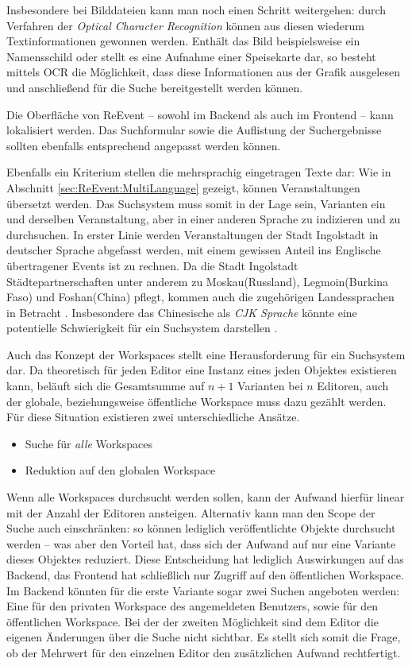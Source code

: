 Insbesondere bei Bilddateien kann man noch einen Schritt weitergehen: durch Verfahren der \emph{Optical Character Recognition} können aus diesen wiederum Textinformationen gewonnen werden. Enthält das Bild beispielsweise ein Namensschild oder stellt es eine Aufnahme einer Speisekarte dar, so besteht mittels OCR die Möglichkeit, dass diese Informationen aus der Grafik ausgelesen und anschließend für die Suche bereitgestellt werden können.

Die Oberfläche von ReEvent -- sowohl im Backend als auch im Frontend -- kann lokalisiert werden. Das Suchformular sowie die Auflistung der Suchergebnisse sollten ebenfalls entsprechend angepasst werden können.

Ebenfalls ein Kriterium stellen die mehrsprachig eingetragen Texte dar: Wie in Abschnitt \ref{sec:ReEvent:MultiLanguage} gezeigt, können Veranstaltungen übersetzt werden. Das Suchsystem muss somit in der Lage sein, Varianten ein und derselben Veranstaltung, aber in einer anderen Sprache zu indizieren und zu durchsuchen. In erster Linie werden Veranstaltungen der Stadt Ingolstadt in deutscher Sprache abgefasst werden, mit einem gewissen Anteil ins Englische übertragener Events ist zu rechnen. Da die Stadt Ingolstadt Städtepartnerschaften unter anderem zu Moskau(Russland), Legmoin(Burkina Faso) und Foshan(China) pflegt, kommen auch die zugehörigen Landessprachen in Betracht \cite{StadtIngolstadt.2014}. Insbesondere das Chinesische als \emph{CJK Sprache} könnte eine potentielle Schwierigkeit für ein Suchsystem darstellen \cite[S. 95f]{Buttcher.2010}.

Auch das Konzept der Workspaces stellt eine Herausforderung für ein Suchsystem dar. Da theoretisch für jeden Editor eine Instanz eines jeden Objektes existieren kann, beläuft sich die Gesamtsumme auf $n+1$ Varianten bei $n$ Editoren, auch der globale, beziehungsweise öffentliche Workspace muss dazu gezählt werden. Für diese Situation existieren zwei unterschiedliche Ansätze.

\begin{itemize}
	\item Suche für \emph{alle} Workspaces
	\item Reduktion auf den globalen Workspace
\end{itemize}

Wenn alle Workspaces durchsucht werden sollen, kann der Aufwand hierfür linear mit der Anzahl der Editoren ansteigen. Alternativ kann man den Scope der Suche auch einschränken: so können lediglich veröffentlichte Objekte durchsucht werden -- was aber den Vorteil hat, dass sich der Aufwand auf nur eine Variante dieses Objektes reduziert. Diese Entscheidung hat lediglich Auswirkungen auf das Backend, das Frontend hat schließlich nur Zugriff auf den öffentlichen Workspace. Im Backend könnten für die erste Variante sogar zwei Suchen angeboten werden: Eine für den privaten Workspace des angemeldeten Benutzers, sowie für den öffentlichen Workspace. Bei der der zweiten Möglichkeit sind dem Editor die eigenen Änderungen über die Suche nicht sichtbar. Es stellt sich somit die Frage, ob der Mehrwert für den einzelnen Editor den zusätzlichen Aufwand rechtfertigt.

